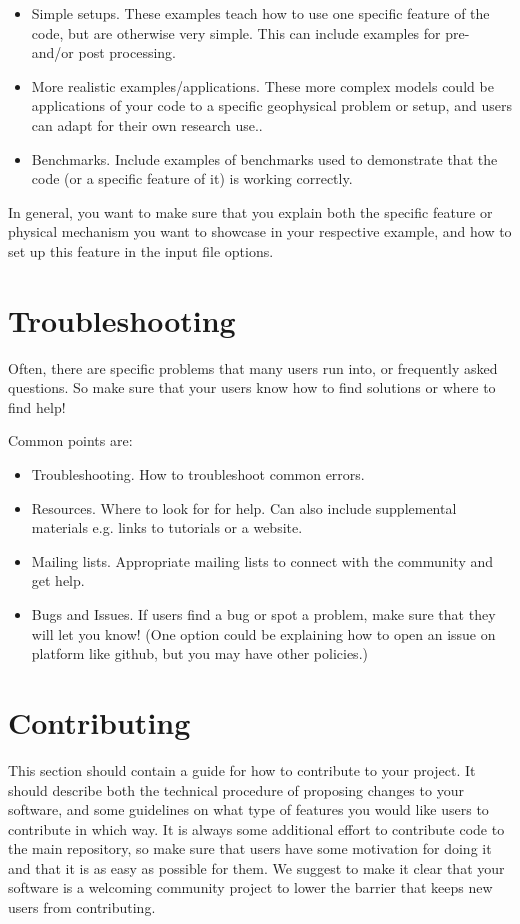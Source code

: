 \documentclass{article}
\begin{document}
\begin{itemize}
\item Simple setups. These examples teach how to use one specific feature of the code, but are otherwise very simple. This can include examples for pre- and/or post processing.
\item More realistic examples/applications. These more complex models could be applications of your code to a specific geophysical problem or setup, and users can adapt for their own research use..
\item Benchmarks. Include examples of benchmarks used to demonstrate that the code (or a specific feature of it) is working correctly.
\end{itemize}

In general, you want to make sure that you explain both the specific feature or physical mechanism you want to showcase in your respective example, and how to set up this feature in the input file options. 

\section{Troubleshooting}

Often, there are specific problems that many users run into, or frequently asked questions. So make sure that your users know how to find solutions or where to find help!

Common points are:
\begin{itemize}
\item Troubleshooting. How to troubleshoot common errors.
\item Resources. Where to look for for help. Can also include supplemental materials e.g. links to tutorials or a website.
\item Mailing lists. Appropriate mailing lists to connect with the community and get help.
\item Bugs and Issues. If users find a bug or spot a problem, make sure that they will let you know! (One option could be explaining how to open an issue on  platform like github, but you may have other policies.)
\end{itemize}

\section{Contributing}

This section should contain a guide for how to contribute to your project. It should describe both the technical procedure of proposing changes to your software, and some guidelines on what type of features you would like users to contribute in which way. 
It is always some additional effort to contribute code to the main repository, so make sure that users have some motivation for doing it and that it is as easy as possible for them. We suggest to make it clear that your software is a welcoming community project to lower the barrier that keeps new users from contributing. 
\end{document}
